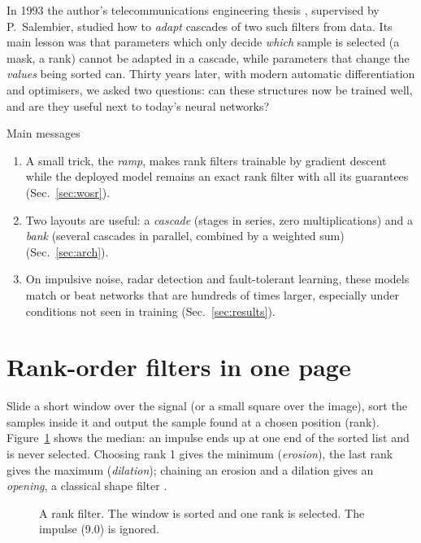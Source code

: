 \documentclass[11pt,a4paper]{article}
\begin{document}
In 1993 the author's telecommunications engineering thesis \cite{delrio1993}, supervised by P.~Salembier, studied how
to \emph{adapt} cascades of two such filters from data. Its main lesson was that parameters which only decide
\emph{which} sample is selected (a mask, a rank) cannot be adapted in a cascade, while parameters that change the
\emph{values} being sorted can. Thirty years later, with modern automatic differentiation and optimisers, we asked
two questions: can these structures now be trained well, and are they useful next to today's neural networks?

\begin{keybox}{Main messages}
\begin{enumerate}\itemsep0pt
\item A small trick, the \emph{ramp}, makes rank filters trainable by gradient descent while the deployed model remains an
  exact rank filter with all its guarantees (Sec.~\ref{sec:wosr}).
\item Two layouts are useful: a \emph{cascade} (stages in series, zero multiplications) and a \emph{bank} (several
  cascades in parallel, combined by a weighted sum) (Sec.~\ref{sec:arch}).
\item On impulsive noise, radar detection and fault-tolerant learning, these models match or beat networks that are
  hundreds of times larger, especially under conditions not seen in training (Sec.~\ref{sec:results}).
\end{enumerate}
\end{keybox}

\section{Rank-order filters in one page}
Slide a short window over the signal (or a small square over the image), sort the samples inside it and output the
sample found at a chosen position (rank). Figure~\ref{fig:median} shows the median: an impulse ends up at one end of
the sorted list and is never selected. Choosing rank 1 gives the minimum (\emph{erosion}), the last rank gives the
maximum (\emph{dilation}); chaining an erosion and a dilation gives an \emph{opening}, a classical shape filter
\cite{pitas1990,maragos1989}.

\begin{figure}[h]\centering
\resizebox{\linewidth}{!}{}
\caption{A rank filter. The window is sorted and one rank is selected. The impulse (9.0) is ignored.}\label{fig:median}
\end{figure}
\end{document}
